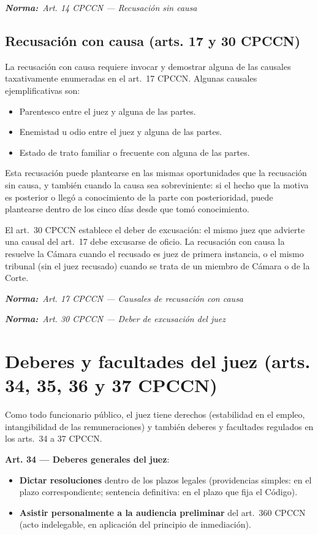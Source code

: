\documentclass[12pt,oneside]{book}
\newcommand{\normaref}[1]{%
    \par\noindent\textbf{\textit{Norma:}}~\textit{#1}\par\vspace{0.2em}
}
\begin{document}
\normaref{Art. 14 CPCCN --- Recusación sin causa}

\subsection{Recusación con causa (arts. 17 y 30 CPCCN)}

La recusación con causa requiere invocar y demostrar alguna de las causales taxativamente enumeradas en el art.\ 17 CPCCN. Algunas causales ejemplificativas son:

\begin{itemize}
    \item Parentesco entre el juez y alguna de las partes.
    \item Enemistad u odio entre el juez y alguna de las partes.
    \item Estado de trato familiar o frecuente con alguna de las partes.
\end{itemize}

Esta recusación puede plantearse en las mismas oportunidades que la recusación sin causa, y también cuando la causa sea sobreviniente: si el hecho que la motiva es posterior o llegó a conocimiento de la parte con posterioridad, puede plantearse dentro de los cinco días desde que tomó conocimiento.

\begin{important}
El art.\ 30 CPCCN establece el deber de excusación: el mismo juez que advierte una causal del art.\ 17 debe excusarse de oficio. La recusación con causa la resuelve la Cámara cuando el recusado es juez de primera instancia, o el mismo tribunal (sin el juez recusado) cuando se trata de un miembro de Cámara o de la Corte.
\end{important}

\normaref{Art. 17 CPCCN --- Causales de recusación con causa}
\normaref{Art. 30 CPCCN --- Deber de excusación del juez}

\section{Deberes y facultades del juez (arts. 34, 35, 36 y 37 CPCCN)}

Como todo funcionario público, el juez tiene derechos (estabilidad en el empleo, intangibilidad de las remuneraciones) y también deberes y facultades regulados en los arts.\ 34 a 37 CPCCN.

\textbf{Art. 34 --- Deberes generales del juez}:
\begin{itemize}
    \item \textbf{Dictar resoluciones} dentro de los plazos legales (providencias simples: en el plazo correspondiente; sentencia definitiva: en el plazo que fija el Código).
    \item \textbf{Asistir personalmente a la audiencia preliminar} del art.\ 360 CPCCN (acto indelegable, en aplicación del principio de inmediación).
\end{itemize}
\end{document}
